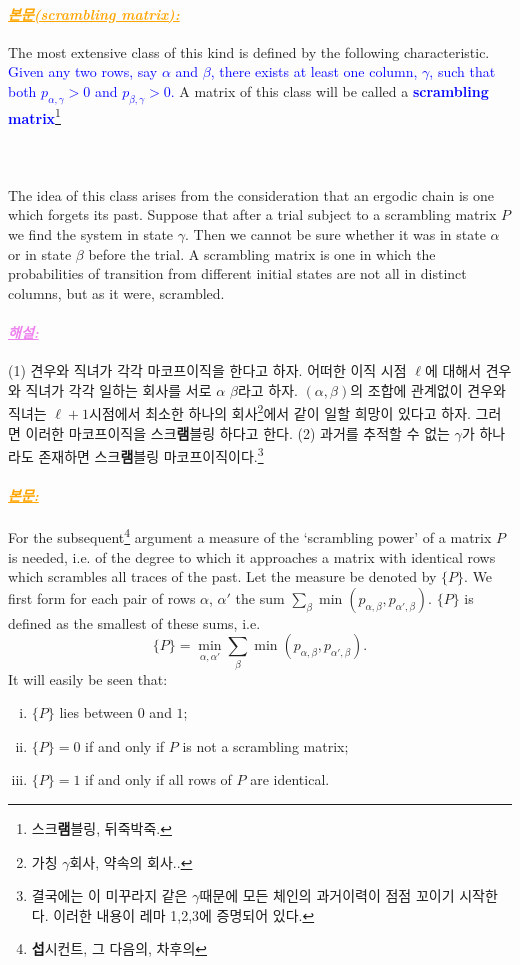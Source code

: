\documentclass[12pt,oneside,english,a4paper]{article}
\def\bk{\paragraph{\LARGE$$}\LARGE}
\newcommand{\paraviolet}[1]{\paragraph{\LARGE\textcolor{violet}{\it\underline{\textbf{#1:}}}}\LARGE}
\newcommand{\paraorange}[1]{\paragraph{\LARGE\textcolor{orange}{\it\underline{\textbf{#1:}}}}\LARGE}
\begin{document}
\paraorange{본문(scrambling matrix)} The most extensive class of this kind is defined by the following characteristic. \textcolor{blue}{Given any two rows, say $\alpha$ and $\beta$, there exists at least one column, $\gamma$, such that both $p_{\alpha, \gamma} > 0$ and $p_{\beta,\gamma}>0$.} A matrix of this class will be called a \textcolor{blue}{\bf scrambling matrix}\footnote{스크{\bf 램}블링, 뒤죽박죽.}
\bk The idea of this class arises from the consideration that an ergodic chain is one which forgets its past. Suppose that after a trial subject to a scrambling matrix $P$ we find the system in state $\gamma$. Then we cannot be sure whether it was in state $\alpha$ or in state $\beta$ before the trial. A scrambling matrix is one in which the probabilities of transition from different initial states are not all in distinct columns, but as it were, scrambled.

\paraviolet{해설} (1) 견우와 직녀가 각각 마코프이직을 한다고 하자. 어떠한 이직 시점 $\ell$에 대해서 견우와 직녀가 각각 일하는 회사를 서로 $\alpha$ $\beta$라고 하자. $(\alpha,\beta)$의 조합에 관계없이 견우와 직녀는 $\ell+1$시점에서 최소한 하나의 회사\footnote{가칭 $\gamma$회사, 약속의 회사..}에서 같이 일할 희망이 있다고 하자. 그러면 이러한 마코프이직을 스크{\bf 램}블링 하다고 한다. (2) 과거를 추적할 수 없는 $\gamma$가 하나라도 존재하면 스크{\bf 램}블링 마코프이직이다.\footnote{결국에는 이 미꾸라지 같은 $\gamma$때문에 모든 체인의 과거이력이 점점 꼬이기 시작한다. 이러한 내용이 레마 1,2,3에 증명되어 있다.} 

\paraorange{본문} For the subsequent\footnote{{\bf 섭}시컨트, 그 다음의, 차후의} argument a measure of the `scrambling power' of a matrix $P$
is needed, i.e. of the degree to which it approaches a matrix with identical rows which scrambles all traces of the past. Let the measure be denoted by $\{P\}$. We first form for each pair of rows $\alpha$, $\alpha'$ the sum $\sum_{\beta}\min(p_{\alpha,\beta},p_{\alpha',\beta})$. $\{P\}$ is defined as the smallest of these sums, i.e.
\[
\{P\}=\min_{\alpha,\alpha'}\sum_{\beta}\min(p_{\alpha,\beta},p_{\alpha',\beta}).
\]
It will easily be seen that:
\begin{enumerate}[(i)]
\item $\{P\}$ lies between $0$ and $1$; 
\item $\{P\}=0$ if and only if $P$ is not a scrambling matrix;
\item $\{P\}=1$ if and only if all rows of $P$ are identical.
\end{enumerate}
\end{document}
